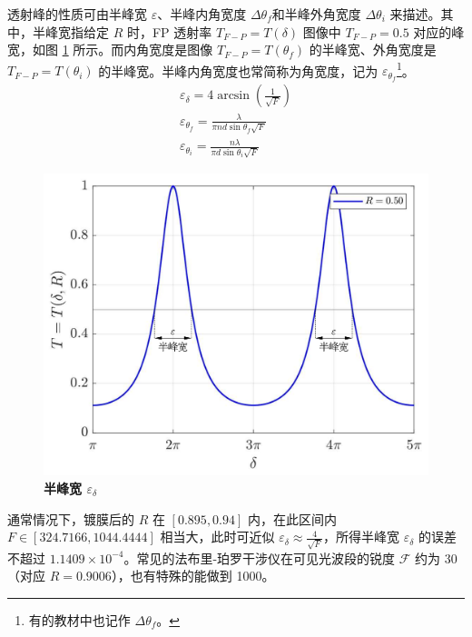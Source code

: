 \documentclass[UTF8]{report}
\theoremstyle{MyLineTheoremStyle} %
\theoremstyle{MyBlockTheoremStyle} %
\theoremstyle{MySubsubsectionStyle} %
\begin{document}
\begin{center}\noindent\begin{minipage}{0.48\columnwidth}
    \hspace*{2em} 透射峰的性质可由半峰宽 $\varepsilon$、半峰内角宽度 $\Delta \theta_f$和半峰外角宽度 $\Delta \theta_i$ 来描述。其中，半峰宽指给定 $R$ 时，FP 透射率 $T_{F-P} = T(\delta)$ 图像中 $T_{F-P} = 0.5$ 对应的峰宽，如图 \ref{半峰宽} 所示。而内角宽度是图像 $T_{F-P} = T(\theta_f)$ 的半峰宽、外角宽度是 $T_{F-P} = T(\theta_i)$ 的半峰宽。半峰内角宽度也常简称为角宽度，记为 $\varepsilon_{\theta_f}$\footnote{有的教材中也记作 $\Delta \theta_f$。}。
\begin{gather}
    \varepsilon_{\delta} = 4 \arcsin \left(\frac{1}{\sqrt{F} }\right) 
    \\
    \varepsilon_{\theta_f} = \frac{\lambda}{\pi n d \sin \theta_f\sqrt{F}}
    \\
    \varepsilon_{\theta_i} = \frac{n \lambda}{\pi d\sin \theta_i \sqrt{F}} 
\end{gather}
\end{minipage}\hfill\begin{minipage}{0.48\columnwidth}
    \begin{figure}[H]\centering
        \includegraphics[width=\columnwidth]{assets/3/半峰宽.pdf}
        \caption{\bfseries 半峰宽 $\varepsilon_{\delta}$}\label{半峰宽}
        \end{figure}
\end{minipage}\end{center}

通常情况下，镀膜后的 $R$ 在 $ [0.895, 0.94]$ 内，在此区间内 $F \in [324.7166, 1044.4444]$ 相当大，此时可近似 $\varepsilon_{\delta} \approx\frac{4}{\sqrt{F}}$，所得半峰宽 $\varepsilon_{\delta}$ 的误差不超过 $ 1.1409\times 10^{-4} $。常见的法布里-珀罗干涉仪在可见光波段的锐度 $\mathscr{F}$ 约为 30（对应 $R = 0.9006$），也有特殊的能做到 1000。
\end{document}
